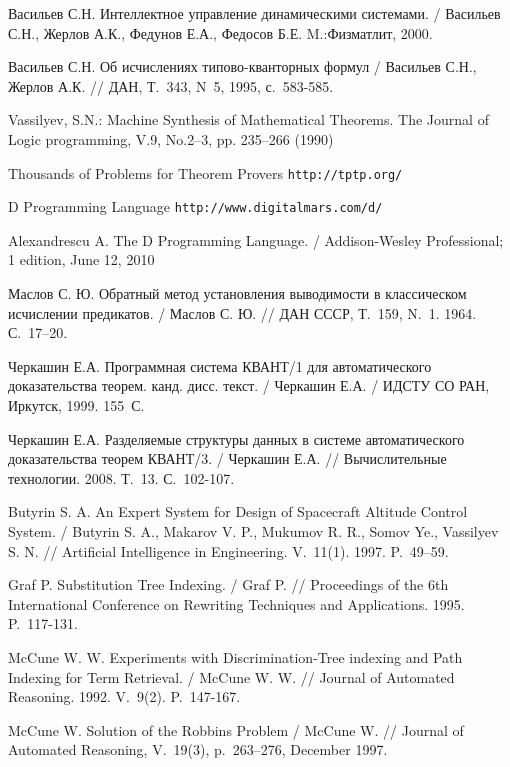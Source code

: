 \begin{thebibliography}{99}

%
%


 Васильев С.Н. Интеллектное управление динамическими системами. / Васильев С.Н., Жерлов А.К., Федунов Е.А., Федосов Б.Е.  M.:Физматлит, 2000.

 Васильев С.Н. Об исчислениях типово-кванторных формул / Васильев С.Н., Жерлов А.К.  // ДАН, Т.~343, N~5, 1995, с.~583-585. 

 Vassilyev, S.N.: Machine Synthesis of Mathematical Theorems. The Journal of Logic programming, V.9, No.2--3, pp. 235--266 (1990)

 Thousands of Problems for Theorem Provers {\tt http://tptp.org/}

 D Programming Language {\tt http://www.digitalmars.com/d/}

 Alexandrescu A. The D Programming Language. / Addison-Wesley Professional; 1 edition, June 12, 2010 

 Маслов С. Ю. Обратный метод установления выводимости в классическом исчислении предикатов. / Маслов С. Ю. // ДАН СССР, Т.~159, N.~1. 1964. С.~17--20.

 Черкашин Е.А. Программная система КВАНТ/1 для автоматического доказательства теорем. канд. дисс. текст. / Черкашин Е.А. / ИДСТУ СО РАН, Иркутск, 1999. 155~С.

 Черкашин Е.А. Разделяемые структуры данных в системе автоматического доказательства теорем КВАНТ/3. / Черкашин Е.А. // Вычислительные технологии. 2008. Т.~13. С.~102-107.

 Butyrin S. A. An {E}xpert {S}ystem for {D}esign of {S}pacecraft  {A}ltitude {C}ontrol {S}ystem. / Butyrin S. A., Makarov V. P., Mukumov R. R., Somov Ye., Vassilyev S. N. // Artificial Intelligence in Engineering. V.~11(1). 1997. P.~49--59.

 Graf P. Substitution Tree Indexing. / Graf P. // Proceedings of the 6th International Conference on Rewriting Techniques and Applications. 1995. P.~117-131.

 McCune W. W. Experiments with Discrimination-Tree indexing and Path Indexing for Term Retrieval. / McCune W. W. // Journal of Automated Reasoning. 1992. V.~9(2). P.~147-167.

 McCune W. Solution of the Robbins Problem / McCune W. // Journal of Automated Reasoning, V.~19(3), p.~263--276, December 1997.


\end{thebibliography}
